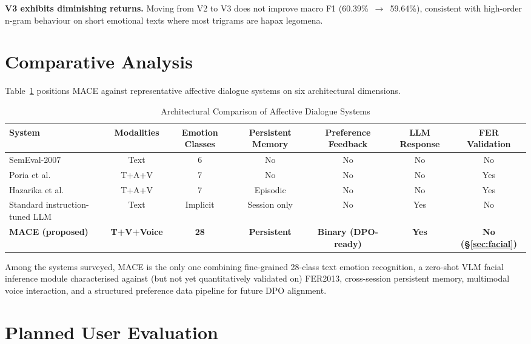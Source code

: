 \documentclass[sigconf, review=true]{acmart}
\begin{document}
\textbf{V3 exhibits diminishing returns.}
Moving from V2 to V3 does not improve macro F1
(60.39\%~$\to$~59.64\%), consistent with high-order n-gram
behaviour on short emotional texts where most trigrams are
hapax legomena.

\section{Comparative Analysis}
\label{sec:comparison}

Table~\ref{tab:comparison} positions MACE against representative
affective dialogue systems on six architectural dimensions.

\begin{table}[t]
\centering
\caption{Architectural Comparison of Affective Dialogue Systems}
\label{tab:comparison}
\begin{tabular}{lcccccc}
\toprule
\textbf{System} &
\textbf{Modalities} &
\textbf{Emotion Classes} &
\textbf{Persistent Memory} &
\textbf{Preference Feedback} &
\textbf{LLM Response} &
\textbf{FER Validation} \\
\midrule
SemEval-2007~\cite{strapparava2007semeval} &
Text & 6 & No & No & No & No \\
Poria et al.~\cite{poria2016convolutional} &
T+A+V & 7 & No & No & No & Yes \\
Hazarika et al.~\cite{hazarika2018conversational} &
T+A+V & 7 & Episodic & No & No & Yes \\
Standard instruction-tuned LLM &
Text & Implicit & Session only & No & Yes & No \\
\textbf{MACE (proposed)} &
\textbf{T+V+Voice} &
\textbf{28} &
\textbf{Persistent} &
\textbf{Binary (DPO-ready)} &
\textbf{Yes} &
\textbf{No (\S\ref{sec:facial})} \\
\bottomrule
\end{tabular}
\end{table}

Among the systems surveyed, MACE is the only one combining
fine-grained 28-class text emotion recognition, a zero-shot VLM
facial inference module characterised against (but not yet
quantitatively validated on) FER2013, cross-session persistent
memory, multimodal voice interaction, and a structured preference
data pipeline for future DPO alignment.

\section{Planned User Evaluation}
\label{sec:userstudy}
\end{document}
